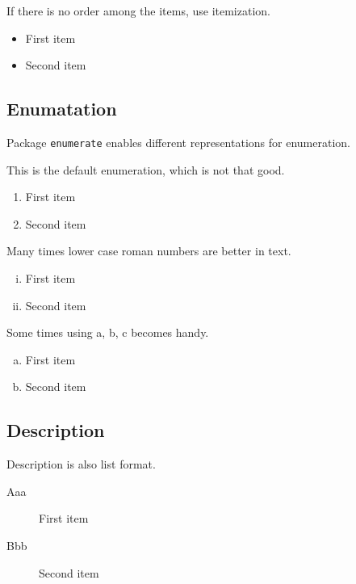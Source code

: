 \documentclass[pre,twocolumn,showkeys,longbibliography]{revtex4-1}
\newcommand{\hCode}[1]{\texttt{#1}}
\theoremstyle{plain}
\theoremstyle{definition}
\theoremstyle{remark}
\begin{document}
If there is no order among the items,
use itemization.
\begin{itemize}
	
	\item 
	First item
	
	\item 
	Second item
	
\end{itemize}





\subsection{Enumatation}

Package \hCode{enumerate} enables different representations for enumeration.

This is the default enumeration,
which is not that good.
\begin{enumerate}
	
	\item 
	First item
	
	\item 
	Second item
	
\end{enumerate}

Many times lower case roman numbers are better in text.
\begin{enumerate}[i.]
	
	\item 
	First item
	
	\item 
	Second item
	
\end{enumerate}

Some times using a, b, c becomes handy.
\begin{enumerate}[a.]
	
	\item 
	First item
	
	\item 
	Second item
	
\end{enumerate}




\subsection{Description}

Description is also list format.
\begin{description}
	
	\item [Aaa]
	First item
	
	\item 
	[Bbb]
	Second item
	
\end{description}
\end{document}
